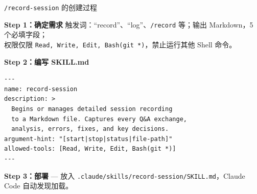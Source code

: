 \documentclass[aspectratio=169]{ctexbeamer}
\begin{document}
\begin{frame}[fragile]{\texttt{/record-session} 的创建过程}
\small

\textbf{Step 1：确定需求}\quad
触发词：“record”、“log”、\texttt{/record} 等；输出 Markdown，5 个必填字段；\\
权限仅限 \texttt{Read, Write, Edit, Bash(git *)}，禁止运行其他 Shell 命令。

\vspace{0.15cm}

\textbf{Step 2：编写 SKILL.md}
\begin{lstlisting}[basicstyle=\ttfamily\footnotesize]
---
name: record-session
description: >
  Begins or manages detailed session recording
  to a Markdown file. Captures every Q&A exchange,
  analysis, errors, fixes, and key decisions.
argument-hint: "[start|stop|status|file-path]"
allowed-tools: [Read, Write, Edit, Bash(git *)]
---
\end{lstlisting}

\vspace{0.15cm}

\textbf{Step 3：部署} — 放入 \texttt{.claude/skills/record-session/SKILL.md}，Claude Code 自动发现加载。
\end{frame}
\end{document}
